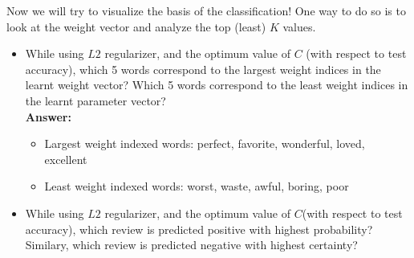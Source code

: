 \documentclass{article}
\begin{document}
Now we will try to visualize the basis of the classification! One way to do so is to look at the weight vector and analyze the top (least) $K$ values.
\begin{itemize}
	\item While using $L2$ regularizer, and the optimum value of $C$ (with respect to test accuracy), which 5 words correspond to the largest weight indices in the learnt weight vector? Which 5 words correspond to the least weight indices in the learnt parameter vector?
	\\\textbf{Answer:}\\
	\begin{itemize}
		\item Largest weight indexed words: perfect, favorite, wonderful, loved, excellent
		\item Least weight indexed words: worst, waste, awful, boring, poor
	\end{itemize}
	
	\item While using $L2$ regularizer, and the optimum value of $C$(with respect to test accuracy), which review is predicted positive with highest probability? Similary, which review is predicted negative with highest certainty?
	

\end{itemize}
\end{document}
